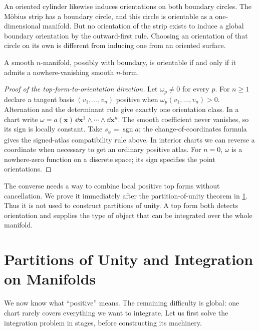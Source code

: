 An oriented cylinder likewise induces orientations on both boundary circles.
The M\"obius strip has a boundary circle, and this circle is orientable as
a one-dimensional manifold. But no orientation of the strip exists to
induce a global boundary orientation by the outward-first rule. Choosing
an orientation of that circle on its own is different from inducing one
from an oriented surface.

\begin{theorem}\label{thm:orientation-top-form}
A smooth $n$-manifold, possibly with boundary, is orientable if and only
if it admits a nowhere-vanishing smooth $n$-form.
\end{theorem}
\begin{proof}[Proof of the top-form-to-orientation direction]
Let $\omega_p\ne0$ for every $p$. For $n\geq1$ declare a tangent basis
$(v_1,\ldots,v_n)$ positive when $\omega_p(v_1,\ldots,v_n)>0$.
Alternation and the determinant rule give exactly one orientation class.
In a chart write $\omega=a(\mathbf{x})\,\dd\mathbf{x}^1\wedge\cdots\wedge\dd\mathbf{x}^n$.
The smooth coefficient never vanishes, so its sign is locally constant.
Take $s_\varphi=\operatorname{sgn}a$; the change-of-coordinates formula
gives the signed-atlas compatibility rule above. In interior charts we
can reverse a coordinate when necessary to get an ordinary positive atlas.
For $n=0$, $\omega$ is a nowhere-zero function on a discrete space;
its sign specifies the point orientations.
\end{proof}
The converse needs a way to combine local positive top forms without
cancellation. We prove it immediately after the partition-of-unity theorem
in \cref{sec:manifold-integration}. Thus it is not used to construct
partitions of unity. A top form both detects orientation and supplies the
type of object that can be integrated over the whole manifold.

\section{Partitions of Unity and Integration on Manifolds}
\label{sec:manifold-integration}
We now know what ``positive'' means. The remaining difficulty is global:
one chart rarely covers everything we want to integrate. Let us first
solve the integration problem in stages, before constructing its machinery.

